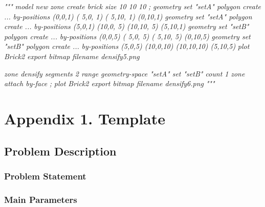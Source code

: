 \documentclass[a4paper, nobind]{templates/ociamthesis}
\newenvironment{Shaded}{\begin{snugshade}}{\end{snugshade}}
\newcommand{\CommentTok}[1]{\textcolor[rgb]{0.56,0.35,0.01}{\textit{#1}}}
\renewenvironment{Shaded}
{
  \vspace{10pt}%
  \begin{snugshade}%
}{%
  \end{snugshade}%
  \vspace{8pt}%
}
\begin{document}
\begin{Shaded}
\begin{Highlighting}[]
\CommentTok{"""}
\CommentTok{model new}
\CommentTok{zone create brick size 10 10 10}
\CommentTok{;}
\CommentTok{geometry set "setA" polygon create ...}
\CommentTok{                    by{-}positions (0,0,1) ( 5,0, 1) ( 5,10, 1) (0,10,1)}
\CommentTok{geometry set "setA" polygon create ...}
\CommentTok{                    by{-}positions (5,0,1) (10,0, 5) (10,10, 5) (5,10,1)}
\CommentTok{geometry set "setB" polygon create ...}
\CommentTok{                    by{-}positions (0,0,5) ( 5,0, 5) ( 5,10, 5) (0,10,5)}
\CommentTok{geometry set "setB" polygon create ...}
\CommentTok{                    by{-}positions (5,0,5) (10,0,10) (10,10,10) (5,10,5)}
\CommentTok{plot \textquotesingle{}Brick2\textquotesingle{} export bitmap filename \textquotesingle{}densify5.png\textquotesingle{}}

\CommentTok{zone densify segments 2 range geometry{-}space "setA" set "setB" count 1}
\CommentTok{zone attach by{-}face}
\CommentTok{;}
\CommentTok{plot \textquotesingle{}Brick2\textquotesingle{} export bitmap filename \textquotesingle{}densify6.png\textquotesingle{}}
\CommentTok{"""}
\end{Highlighting}
\end{Shaded}

\startappendices

\hypertarget{appendix-1.-template}{%
\chapter{Appendix 1. Template}\label{appendix-1.-template}}

\hypertarget{problem-description-2}{%
\section{Problem Description}\label{problem-description-2}}

\hypertarget{problem-statement-2}{%
\subsection{Problem Statement}\label{problem-statement-2}}

\hypertarget{main-parameters-2}{%
\subsection{Main Parameters}\label{main-parameters-2}}
\end{document}
